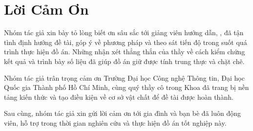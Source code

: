 \chapter*{Lời Cảm Ơn}

Nhóm tác giả xin bày tỏ lòng biết ơn sâu sắc tới giảng viên hướng dẫn, \Supervisor, đã tận tình định hướng đề tài, góp ý về phương pháp và theo sát tiến độ trong suốt quá trình thực hiện đồ án. Những nhận xét thẳng thắn của thầy về cách kiểm chứng kết quả và trình bày số liệu đã giúp đồ án giữ được tính trung thực và chặt chẽ.

Nhóm tác giả trân trọng cảm ơn Trường Đại học Công nghệ Thông tin, Đại học Quốc gia Thành phố Hồ Chí Minh, cùng quý thầy cô trong Khoa đã trang bị nền tảng kiến thức và tạo điều kiện về cơ sở vật chất để đề tài được hoàn thành.

Sau cùng, nhóm tác giả xin gửi lời cảm ơn tới gia đình và bạn bè đã luôn động viên, hỗ trợ trong thời gian nghiên cứu và thực hiện đồ án tốt nghiệp này.
